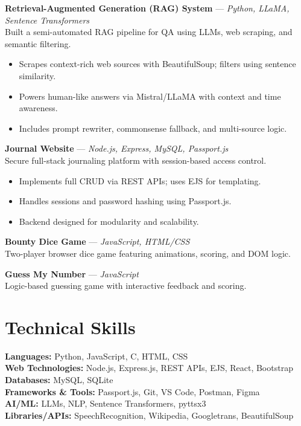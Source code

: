 \documentclass[9.5pt,a4paper]{article} %
\begin{document}
\textbf{Retrieval-Augmented Generation (RAG) System} — \textit{Python, LLaMA, Sentence Transformers} \\
Built a semi-automated RAG pipeline for QA using LLMs, web scraping, and semantic filtering.
\begin{itemize}
    \item Scrapes context-rich web sources with BeautifulSoup; filters using sentence similarity.
    \item Powers human-like answers via Mistral/LLaMA with context and time awareness.
    \item Includes prompt rewriter, commonsense fallback, and multi-source logic.
\end{itemize}

\textbf{Journal Website} — \textit{Node.js, Express, MySQL, Passport.js} \\
Secure full-stack journaling platform with session-based access control.
\begin{itemize}
    \item Implements full CRUD via REST APIs; uses EJS for templating.
    \item Handles sessions and password hashing using Passport.js.
    \item Backend designed for modularity and scalability.
\end{itemize}

\textbf{Bounty Dice Game} — \textit{JavaScript, HTML/CSS} \\
Two-player browser dice game featuring animations, scoring, and DOM logic.

\textbf{Guess My Number} — \textit{JavaScript} \\
Logic-based guessing game with interactive feedback and scoring.

\section*{Technical Skills}
\textbf{Languages:} Python, JavaScript, C, HTML, CSS \\
\textbf{Web Technologies:} Node.js, Express.js, REST APIs, EJS, React, Bootstrap \\
\textbf{Databases:} MySQL, SQLite \\
\textbf{Frameworks \& Tools:} Passport.js, Git, VS Code, Postman, Figma \\
\textbf{AI/ML:} LLMs, NLP, Sentence Transformers, pyttsx3 \\
\textbf{Libraries/APIs:} SpeechRecognition, Wikipedia, Googletrans, BeautifulSoup
\end{document}
